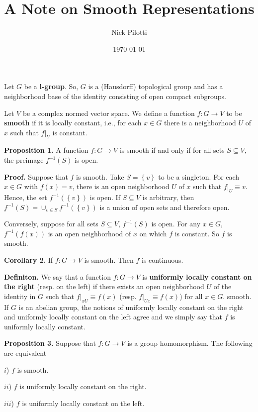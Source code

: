 \documentclass[12pt]{article}
\title{A Note on Smooth Representations}
\author{Nick Pilotti}
\date{\today}
\begin{document}
\maketitle

Let $G$ be a \textbf{l-group}. So, $G$ is a (Hausdorff) topological group and
has a neighborhood base of the identity consisting of open compact subgroups.

Let $V$ be a complex normed vector space. We define a function $f : G \rightarrow V$ to be
\textbf{smooth} if it is locally constant, i.e., for each $x \in G$ there is a
neighborhood $U$ of $x$ such that $f|_{U}$ is constant.

\textbf{Proposition 1.} A function $f : G \rightarrow V$ is smooth if and only if
for all sets $S \subseteq V$, the preimage $f^{-1}\left(S\right)$ is open.

\textbf{Proof.} Suppose that $f$ is smooth. Take $S = \left\{v\right\}$ to be a
singleton. For each $x \in G$ with $f\left(x\right) = v$, there is an open
neighborhood $U$ of $x$ such that $f|_{U} \equiv v$. Hence, the set
$f^{-1}\left(\left\{v\right\}\right)$ is open. If $S \subseteq V$ is arbitrary,
then $f^{-1}\left(S\right) = \cup_{v \in S} f^{-1}\left(\left\{v\right\}\right)$
is a union of open sets and therefore open.

Conversely, suppose for all sets $S \subseteq V$, $f^{-1}\left(S\right)$ is
open. For any $x \in G$, $f^{-1}\left(f\left(x\right)\right)$ is an open
neighborhood of $x$ on which $f$ is constant. So $f$ is smooth.

\textbf{Corollary 2.} If $f : G \rightarrow V$ is smooth. Then $f$ is continuous.

\textbf{Definiton.} We say that a function $f : G \rightarrow V$ is
\textbf{uniformly locally constant on the right} (resp. on the left) if there
exists an open neighborhood $U$ of the identity in $G$ such that $f|_{xU} \equiv
f\left(x\right)$ (resp. $f|_{Ux} \equiv f\left(x\right)$) for all $x \in G$.
smooth. If $G$ is an abelian group, the notions of uniformly locally constant on
the right and uniformly locally constant on the left agree and we simply say
that $f$ is uniformly locally constant.

\textbf{Proposition 3.} Suppose that $f : G \rightarrow V$ is a group
homomorphism. The following are equivalent

$i$) $f$ is smooth.

$ii$) $f$ is uniformly locally constant on the right.

$iii$) $f$ is uniformly locally constant on the left.
\end{document}
